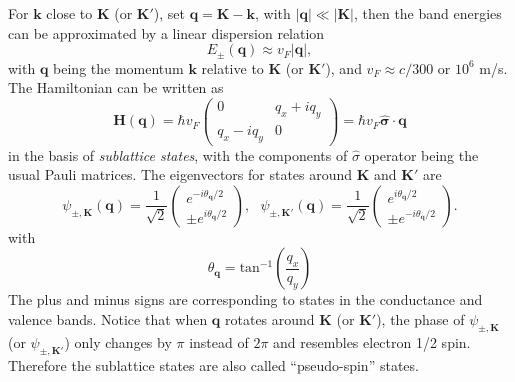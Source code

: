 \documentclass[pdflatex, sectionletters, 12pt, final, phd]{pittetd}    %
\begin{document}
For $\mathbf{k}$ close to $\mathbf{K}$ (or $\mathbf{K'}$), set $\mathbf{q} = \mathbf{K} - \mathbf{k}$, with $|\mathbf{q}| \ll |\mathbf{K}|$, then the band energies can be approximated by a linear dispersion relation
$$E_{\pm}(\mathbf{q}) \approx v_F|\mathbf{q}|,$$
with $\mathbf{q}$ being the momentum $\mathbf{k}$ relative to $\mathbf{K}$ (or $\mathbf{K'}$), and $v_F \approx c/300$ or $10^6$ m/s. The Hamiltonian can be written as 
\begin{equation}
\mathbf{H}(\mathbf{q}) = 
\hbar v_F 
\begin{pmatrix}
0 & q_x + iq_y \\
q_x - iq_y & 0
\end{pmatrix}
=
\hbar v_F \hat{\mathbf{\sigma}} \cdot \mathbf{q}
\label{EQN:DiracHamiltonian}
\end{equation}
in the basis of \emph{sublattice states}, with the components of $\hat{\sigma}$ operator being the usual Pauli matrices. The eigenvectors for states around $\mathbf{K}$ and $\mathbf{K'}$ are
\begin{equation}
\psi_{\pm, \mathbf{K}}(\mathbf{q}) = \frac{1}{\sqrt{2}} 
\begin{pmatrix}
e^{-i\theta_{\mathbf{q}}/2} \\
\pm e^{i\theta_{\mathbf{q}}/2}
\end{pmatrix}, \ \ \
\psi_{\pm, \mathbf{K'}}(\mathbf{q}) = \frac{1}{\sqrt{2}} 
\begin{pmatrix}
e^{i\theta_{\mathbf{q}}/2} \\
\pm e^{-i\theta_{\mathbf{q}}/2}
\end{pmatrix}.
\label{EQN:Eigenstates}
\end{equation}
with 
$$\theta_\mathbf{q} = \mathrm{tan}^{-1}\left(\frac{q_x}{q_y}\right)$$
The plus and minus signs are corresponding to states in the conductance and valence bands. Notice that when $\mathbf{q}$ rotates around $\mathbf{K}$ (or $\mathbf{K'}$), the phase of $\psi_{\pm, \mathbf{K}}$ (or $\psi_{\pm, \mathbf{K'}}$) only changes by $\pi$ instead of $2\pi$ and resembles electron 1/2 spin. Therefore the sublattice states are also called ``pseudo-spin'' states\cite{neto2009electronic}. 
\end{document}
